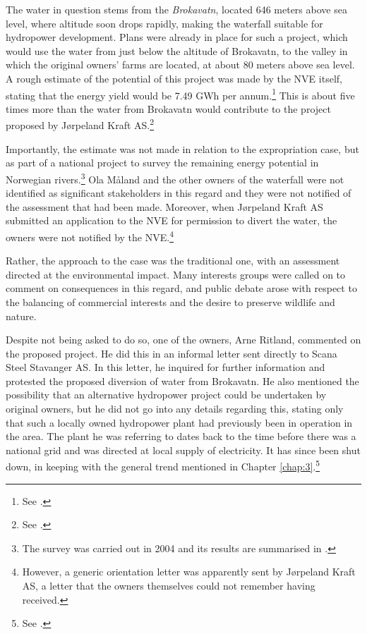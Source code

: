 The water in question stems from the \emph{Brokavatn}, located 646 meters above sea level, where altitude soon drops rapidly, making the waterfall suitable for hydropower development. Plans were already in place for such a project, which would use the water from just below the altitude of Brokavatn, to the valley in which the original owners' farms are located, at about 80 meters above sea level. A rough estimate of the potential of this project was made by the NVE itself, stating that the energy yield would be 7.49 GWh per annum.\footnote{See \cite{jorpeland09}.} This is about five times more than the water from Brokavatn would contribute to the project proposed by Jørpeland Kraft AS.\footnote{See \cite{jorpeland09}.}

Importantly, the estimate was not made in relation to the expropriation case, but as part of a national project to survey the remaining energy potential in Norwegian rivers.\footnote{The survey was carried out in 2004 and its results are summarised in \cite{jensen04}.} Ola Måland and the other owners of the waterfall were not identified as significant stakeholders in this regard and they were not notified of the assessment that had been made. Moreover, when Jørpeland Kraft AS submitted an application to the NVE for permission to divert the water, the owners were not notified by the NVE.\footnote{However, a generic orientation letter was apparently sent by Jørpeland Kraft AS, a letter that the owners themselves could not remember having received.}

Rather, the approach to the case was the traditional one, with an assessment directed at the environmental impact. Many interests groups were called on to comment on consequences in this regard, and public debate arose with respect to the balancing of commercial interests and the desire to preserve wildlife and nature.

Despite not being asked to do so, one of the owners, Arne Ritland, commented on the proposed project. He did this in an informal letter sent directly to Scana Steel Stavanger AS. In this letter, he inquired for further information and protested the proposed diversion of water from Brokavatn. He also mentioned the possibility that an alternative hydropower project could be undertaken by original owners, but he did not go into any details regarding this, stating only that such a locally owned hydropower plant had previously been in operation in the area. The plant he was referring to dates back to the time before there was a national grid and was directed at local supply of electricity. It has since been shut down, in keeping with the general trend mentioned in Chapter \ref{chap:3}.\footnote{See \cite{jorpeland09}.}

